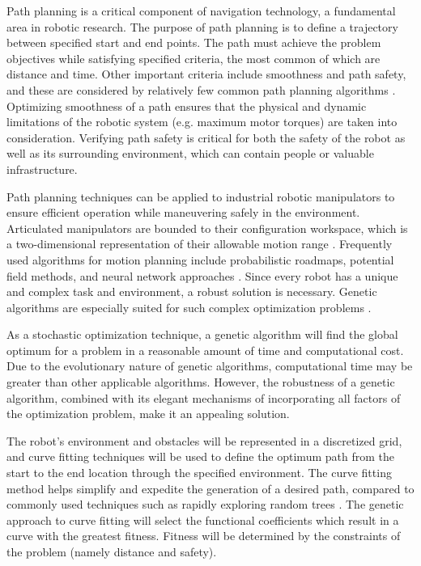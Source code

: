 
Path planning is a critical component of navigation technology, a fundamental area in robotic research. The purpose of path planning is to define a trajectory between specified start and end points. The path must achieve the problem objectives while satisfying specified criteria, the most common of which are distance and time. Other important criteria include smoothness and path safety, and these are considered by relatively few common path planning algorithms \cite{elshamli04}. Optimizing smoothness of a path ensures that the physical and dynamic limitations of the robotic system (e.g. maximum motor torques) are taken into consideration. Verifying path safety is critical for both the safety of the robot as well as its surrounding environment, which can contain people or valuable infrastructure.

Path planning techniques can be applied to industrial robotic manipulators to ensure efficient operation while maneuvering safely in the environment. Articulated manipulators are bounded to their configuration workspace, which is a two-dimensional representation of their allowable motion range \cite{kavraki96}. Frequently used algorithms for motion planning include probabilistic roadmaps, potential field methods, and neural network approaches \cite{sharir89,khosla88,rimon92,yang00}. Since every robot has a unique and complex task and environment, a robust solution is necessary. Genetic algorithms are especially suited for such complex optimization problems \cite{renner03}.

As a stochastic optimization technique, a genetic algorithm will find the global optimum for a problem in a reasonable amount of time and computational cost. Due to the evolutionary nature of genetic algorithms, computational time may be greater than other applicable algorithms. However, the robustness of a genetic algorithm, combined with its elegant mechanisms of incorporating all factors of the optimization problem, make it an appealing solution.

The robot's environment and obstacles will be represented in a discretized grid, and curve fitting techniques will be used to define the optimum path from the start to the end location through the specified environment. The curve fitting method helps simplify and expedite the generation of a desired path, compared to commonly used techniques such as rapidly exploring random trees \cite{rodriguez06}. The genetic approach to curve fitting will select the functional coefficients which result in a curve with the greatest fitness. Fitness will be determined by the constraints of the problem (namely distance and safety).

